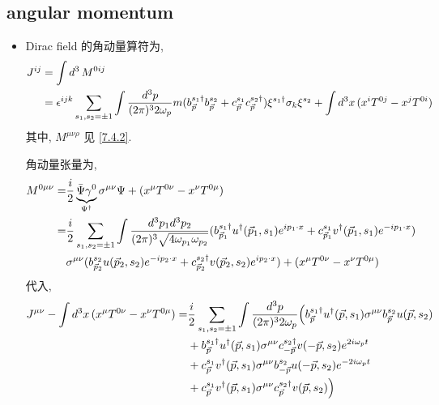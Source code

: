 \subsection{angular momentum}
\begin{itemize}
	\item Dirac field 的角动量算符为,
	\begin{align}
		J^{i j} &= \int d^3 \, M^{0 i j} \notag \\
		&= \epsilon^{i j k} \sum_{s_1, s_2 = \pm 1} \int \frac{d^3 p}{(2 \pi)^3 2 \omega_p} m (b^{s_1 \dag}_{\vec{p}} b^{s_2}_{\vec{p}} + c^{s_1}_{\vec{p}} c^{s_2 \dag}_{\vec{p}}) \xi^{s_1 \dag} \sigma_k \xi^{s_2} + \int d^3 x \, (x^i T^{0 j} - x^j T^{0 i})
	\end{align}
	其中, $M^{\mu \nu \rho}$ 见 \eqref{7.4.2}.
	
	\begin{tcolorbox}[title=calculation:]
		角动量张量为,
		\begin{align}
			M^{0 \mu \nu} =& \frac{i}{2} \underbrace{\bar{\Psi} \gamma^0}_{\Psi^\dag} \sigma^{\mu \nu} \Psi + (x^\mu T^{0 \nu} - x^\nu T^{0 \mu}) \notag \\
			=& \frac{i}{2} \sum_{s_1, s_2 = \pm 1} \int \frac{d^3 p_1 d^3 p_2}{(2 \pi)^3 \sqrt{4 \omega_{p_1} \omega_{p_2}}} (b^{s_1 \dag}_{\vec{p}_1} u^\dag(\vec{p}_1, s_1) e^{i p_1 \cdot x} + c^{s_1}_{\vec{p}_1} v^\dag(\vec{p}_1, s_1) e^{- i p_1 \cdot x}) \notag \\
			& \sigma^{\mu \nu} (b^{s_2}_{\vec{p}_2} u(\vec{p}_2, s_2) e^{- i p_2 \cdot x} + c^{s_2 \dag}_{\vec{p}_2} v(\vec{p}_2, s_2) e^{i p_2 \cdot x}) + (x^\mu T^{0 \nu} - x^\nu T^{0 \mu})
		\end{align}
		代入,
		\begin{align}
			J^{\mu \nu} - \int d^3 x \, (x^\mu T^{0 \nu} - x^\nu T^{0 \mu}) =& \frac{i}{2} \sum_{s_1, s_2 = \pm 1} \int \frac{d^3 p}{(2 \pi)^3 2 \omega_p} \Big( b^{s_1 \dag}_{\vec{p}} u^\dag(\vec{p}, s_1) \sigma^{\mu \nu} b^{s_2}_{\vec{p}} u(\vec{p}, s_2) \notag \\
			& + b^{s_1 \dag}_{\vec{p}} u^\dag(\vec{p}, s_1) \sigma^{\mu \nu} c^{s_2 \dag}_{- \vec{p}} v(- \vec{p}, s_2) e^{2 i \omega_p t} \notag \\
			& + c^{s_1}_{\vec{p}} v^\dag(\vec{p}, s_1) \sigma^{\mu \nu} b^{s_2}_{- \vec{p}} u(- \vec{p}, s_2) e^{- 2 i \omega_p t} \notag \\
			& + c^{s_1}_{\vec{p}} v^\dag(\vec{p}, s_1) \sigma^{\mu \nu} c^{s_2 \dag}_{\vec{p}} v(\vec{p}, s_2) \Big)
		\end{align}

\end{tcolorbox}
\end{itemize}
